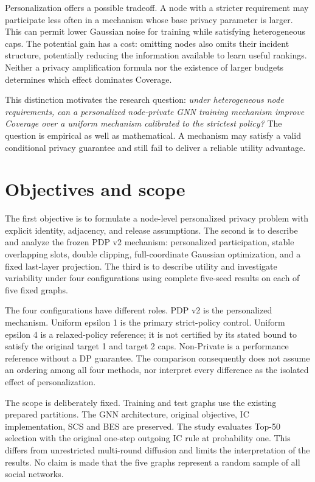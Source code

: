Personalization offers a possible tradeoff. A node with a stricter requirement may participate less often in a mechanism whose base privacy parameter is larger. This can permit lower Gaussian noise for training while satisfying heterogeneous caps. The potential gain has a cost: omitting nodes also omits their incident structure, potentially reducing the information available to learn useful rankings. Neither a privacy amplification formula nor the existence of larger budgets determines which effect dominates Coverage.

This distinction motivates the research question: \emph{under heterogeneous node requirements, can a personalized node-private GNN training mechanism improve Coverage over a uniform mechanism calibrated to the strictest policy?} The question is empirical as well as mathematical. A mechanism may satisfy a valid conditional privacy guarantee and still fail to deliver a reliable utility advantage.

\section{Objectives and scope}
The first objective is to formulate a node-level personalized privacy problem with explicit identity, adjacency, and release assumptions. The second is to describe and analyze the frozen PDP v2 mechanism: personalized participation, stable overlapping slots, double clipping, full-coordinate Gaussian optimization, and a fixed last-layer projection. The third is to describe utility and investigate variability under four configurations using complete five-seed results on each of five fixed graphs.

The four configurations have different roles. PDP v2 is the personalized mechanism. Uniform epsilon 1 is the primary strict-policy control. Uniform epsilon 4 is a relaxed-policy reference; it is not certified by its stated bound to satisfy the original target 1 and target 2 caps. Non-Private is a performance reference without a DP guarantee. The comparison consequently does not assume an ordering among all four methods, nor interpret every difference as the isolated effect of personalization.

The scope is deliberately fixed. Training and test graphs use the existing prepared partitions. The GNN architecture, original objective, IC implementation, SCS and BES are preserved. The study evaluates Top-50 selection with the original one-step outgoing IC rule at probability one. This differs from unrestricted multi-round diffusion and limits the interpretation of the results. No claim is made that the five graphs represent a random sample of all social networks.

